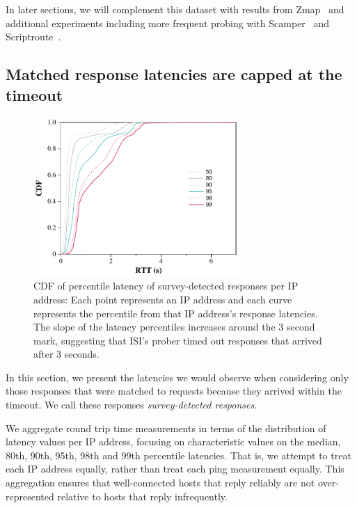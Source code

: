 In later sections, we will complement this dataset with
results from Zmap~\cite{durumeric2013zmap} and additional experiments
including more frequent probing with Scamper~\cite{luckie2010scamper} and
Scriptroute~\cite{usits03-spring}.

\subsection{Matched response latencies are capped at the timeout}

\begin{figure}[t]
\begin{center}
\includegraphics[width=0.7\textwidth]{timeouts/figs/cdf_raw_ping_ttl}
\end{center}
\caption{\label{fig:raw_lat}%
CDF of percentile latency of survey-detected responses per IP address: Each point represents an IP address
and each curve represents the percentile from that IP address's
response latencies. The slope of the latency
percentiles increases around the 3 second mark, suggesting that
ISI's prober timed out responses that arrived after 3 seconds.
}
\end{figure}

In this section, we present the latencies we would observe
when considering only those responses that were matched to 
requests because they arrived within the timeout.  We call 
these responses \emph{survey-detected responses}.

We aggregate round trip time measurements in terms of the
distribution of latency values per IP address, focusing on
characteristic values on the median, 80th, 90th, 95th, 98th
and 99th percentile latencies.  That is, we attempt to treat
each IP address equally, rather than treat each ping
measurement equally.  This aggregation ensures that
well-connected hosts that reply reliably are not
over-represented relative to hosts that reply infrequently.

